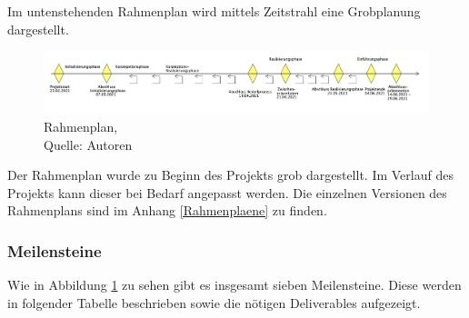 Im untenstehenden Rahmenplan wird mittels Zeitstrahl eine Grobplanung dargestellt. 

\begin{figure}[H]
    \centering
   \includegraphics[width=1\textwidth]{images/SoDa_Zeitstrahl.png}
    \caption[SoDa Rahmenplan]{Rahmenplan,\\ Quelle: Autoren}
    \label{img: SoDa Rahmenplan}
\end{figure}
Der Rahmenplan wurde zu Beginn des Projekts grob dargestellt. Im Verlauf des Projekts kann dieser bei Bedarf angepasst werden. Die einzelnen Versionen des Rahmenplans sind im Anhang \ref{Rahmenplaene} zu finden. 
\newpage
\subsubsection{Meilensteine}\label{Meilensteine}
Wie in Abbildung \ref{img: SoDa Rahmenplan} zu sehen gibt es insgesamt sieben Meilensteine.
Diese werden in folgender Tabelle beschrieben sowie die nötigen Deliverables aufgezeigt.


